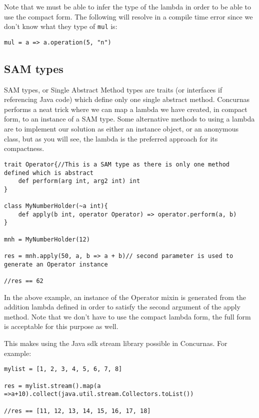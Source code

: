 \documentclass[conc-doc]{subfiles}
\begin{document}
Note that we must be able to infer the type of the lambda in order to be able to use the compact form. The following will resolve in a compile time error since we don't know what they type of \lstinline{mul} is:
\begin{lstlisting}
mul = a => a.operation(5, "n")
\end{lstlisting}

\subsection{SAM types}
SAM types, or Single Abstract Method types are traits (or interfaces if referencing Java code) which define only one single abstract method. Concurnas performs a neat trick where we can map a lambda we have created, in compact form, to an instance of a SAM type. Some alternative methods to using a lambda are to implement our solution as either an instance object, or an anonymous class, but as you will see, the lambda is the preferred approach for its compactness.

\begin{lstlisting}
trait Operator{//This is a SAM type as there is only one method defined which is abstract 
	def perform(arg int, arg2 int) int
}

class MyNumberHolder(~a int){
	def apply(b int, operator Operator) => operator.perform(a, b)
}

mnh = MyNumberHolder(12)

res = mnh.apply(50, a, b => a + b)// second parameter is used to generate an Operator instance

//res == 62
\end{lstlisting}

In the above example, an instance of the Operator mixin is generated from the addition lambda defined in order to satisfy the second argument of the apply method. Note that we don't have to use the compact lambda form, the full form is acceptable for this purpose as well.

This makes using the Java sdk stream library possible in Concurnas. For example:

\begin{lstlisting}
mylist = [1, 2, 3, 4, 5, 6, 7, 8]

res = mylist.stream().map(a =>a+10).collect(java.util.stream.Collectors.toList())

//res == [11, 12, 13, 14, 15, 16, 17, 18]
\end{lstlisting}
\end{document}

